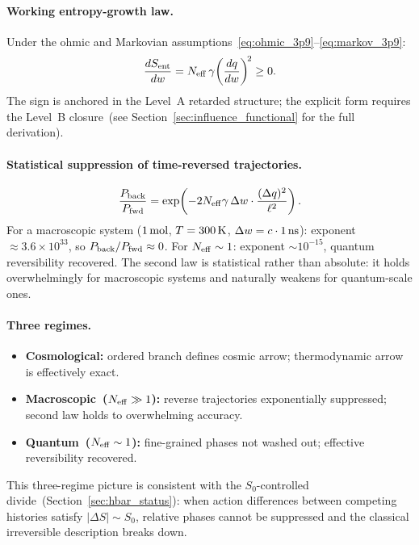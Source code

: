 \documentclass[11pt,a4paper]{article}
\numberwithin{equation}{section}
\begin{document}
\paragraph{Working entropy-growth law.}
Under the ohmic and Markovian
assumptions~\eqref{eq:ohmic_3p9}--\eqref{eq:markov_3p9}:
\begin{equation}
  \frac{dS_{\rm ent}}{dw}
  = N_{\rm eff}\,\gamma\!\left(\frac{dq}{dw}\right)^{\!2}
  \geq 0.
  \label{eq:dSdw_second_law}
\end{equation}
The sign is anchored in the Level~A retarded structure;
the explicit form requires the Level~B closure~(see
Section~\ref{sec:influence_functional} for the full derivation).

\paragraph{Statistical suppression of time-reversed trajectories.}
\begin{equation}
  \frac{P_{\rm back}}{P_{\rm fwd}}
  = \exp\!\left(-2N_{\rm eff}\gamma\,\Delta w
    \cdot\frac{(\Delta q)^2}{\ell^2}\right).
  \label{eq:PbackPfwd}
\end{equation}
For a macroscopic system ($1\,{\rm mol}$, $T=300\,{\rm K}$,
$\Delta w = c\cdot 1\,{\rm ns}$): exponent
$\approx 3.6\times10^{33}$, so
$P_{\rm back}/P_{\rm fwd}\approx 0$.
For $N_{\rm eff}\sim 1$: exponent $\sim 10^{-15}$, quantum
reversibility recovered.
The second law is statistical rather than absolute: it holds
overwhelmingly for macroscopic systems and naturally weakens for
quantum-scale ones.

\paragraph{Three regimes.}
\begin{itemize}
  \item \textbf{Cosmological:} ordered branch defines cosmic arrow;
    thermodynamic arrow is effectively exact.
  \item \textbf{Macroscopic~($N_{\rm eff}\gg 1$):} reverse trajectories
    exponentially suppressed; second law holds to overwhelming accuracy.
  \item \textbf{Quantum~($N_{\rm eff}\sim 1$):} fine-grained phases not
    washed out; effective reversibility recovered.
\end{itemize}
This three-regime picture is consistent with the $S_0$-controlled
divide~(Section~\ref{sec:hbar_status}): when action differences between
competing histories satisfy $|\Delta S|\sim S_0$, relative phases
cannot be suppressed and the classical irreversible description breaks
down.
\end{document}
